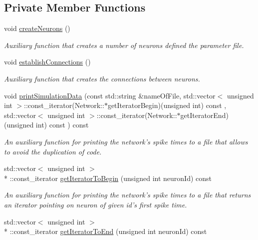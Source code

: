 \subsection*{Private Member Functions}
\begin{DoxyCompactItemize}
\item 
void \hyperlink{classNetwork_aabc3688063e1c802d7e23ed2a3268ce2}{create\-Neurons} ()
\begin{DoxyCompactList}\small\item\em Auxiliary function that creates a number of neurons defined the parameter file. \end{DoxyCompactList}\item 
void \hyperlink{classNetwork_a0f7791473e2dab1ed23d0af25e3c866d}{establish\-Connections} ()
\begin{DoxyCompactList}\small\item\em Auxiliary function that creates the connections between neurons. \end{DoxyCompactList}\item 
void \hyperlink{classNetwork_ad28d5206f20213eba2143222c566fb00}{print\-Simulation\-Data} (const std\-::string \&name\-Of\-File, std\-::vector$<$ unsigned int $>$\-::const\-\_\-iterator(Network\-::$\ast$get\-Iterator\-Begin)(unsigned int) const , std\-::vector$<$ unsigned int $>$\-::const\-\_\-iterator(Network\-::$\ast$get\-Iterator\-End)(unsigned int) const ) const 
\begin{DoxyCompactList}\small\item\em An auxiliary function for printing the network's spike times to a file that allows to avoid the duplication of code. \end{DoxyCompactList}\item 
std\-::vector$<$ unsigned int $>$\\*
\-::const\-\_\-iterator \hyperlink{classNetwork_a92fcc003c80ba7657389c500d7b9a0c1}{get\-Iterator\-To\-Begin} (unsigned int neuron\-Id) const 
\begin{DoxyCompactList}\small\item\em An auxiliary function for printing the network's spike times to a file that returns an iterator pointing on neuron of given id's first spike time. \end{DoxyCompactList}\item 
std\-::vector$<$ unsigned int $>$\\*
\-::const\-\_\-iterator \hyperlink{classNetwork_a9d5998fdbac5347ebd70936dfaf7b47c}{get\-Iterator\-To\-End} (unsigned int neuron\-Id) const 

\end{DoxyCompactItemize}
